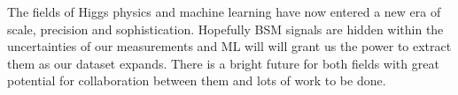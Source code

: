 The fields of Higgs physics and machine learning have now entered a new era of scale, precision and sophistication.
Hopefully BSM signals are hidden within the uncertainties of our measurements and ML will will grant us the power to extract them as our dataset expands.
There is a bright future for both fields with great potential for collaboration between them and lots of work to be done. 









